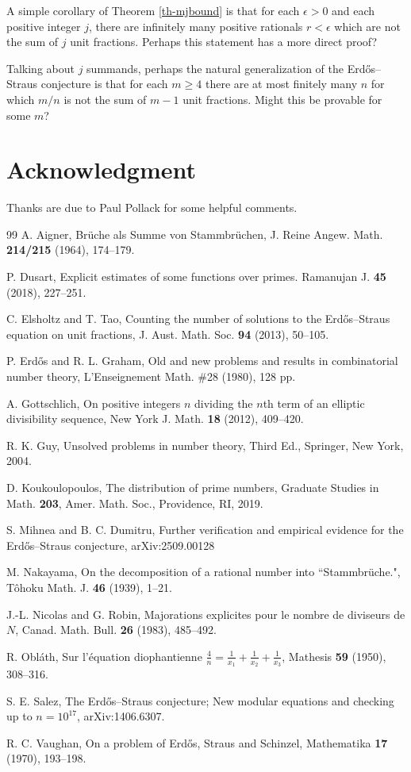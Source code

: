 \documentclass[12pt]{amsart}
\theoremstyle{definition}
\theoremstyle{remark}
\numberwithin{equation}{section}
\begin{document}
A simple corollary of Theorem \ref{th-mjbound} is that for each $\epsilon>0$ and each 
positive integer $j$, there are infinitely many positive rationals $r<\epsilon$ which are
not the sum of $j$ unit fractions.  Perhaps this statement has a more direct proof?

Talking about $j$ summands, perhaps the natural generalization of the Erd\H os--Straus
conjecture is that for each $m\ge4$ there are at most finitely many $n$ for which
$m/n$ is not the sum of $m-1$ unit fractions.   Might this be provable for some $m$?

\section*{Acknowledgment}
Thanks are due to Paul Pollack for some helpful comments.

\begin{thebibliography}{99}
 A. Aigner, Br\"uche als Summe von Stammbr\"uchen, J. Reine Angew. Math. 
 {\bf 214/215} (1964), 174--179.
 
 P. Dusart,
Explicit estimates of some functions over primes. Ramanujan J. {\bf45} (2018), 227--251. 

 C. Elsholtz and T. Tao,
Counting the number of solutions to the Erd\H{o}s--Straus equation on unit fractions,
J. Aust. Math. Soc. {\bf94 }(2013), 50--105.

 P. Erd\H os and R. L. Graham,
Old and new problems and results in combinatorial number theory,
L'Enseignement Math. \#28 (1980), 128 pp.

 A. Gottschlich,
On positive integers $n$ dividing the $n$th
term of an elliptic divisibility sequence,
New York J. Math. {\bf18} (2012), 409--420.

 R. K. Guy,
Unsolved problems in number theory,
Third Ed., Springer, New York, 2004.

 D. Koukoulopoulos,
The distribution of prime numbers, Graduate Studies in Math. {\bf203},
Amer. Math. Soc., Providence, RI, 2019.

 S. Mihnea and B. C. Dumitru,
Further verification and empirical evidence for the Erd\H os--Straus conjecture,
arXiv:2509.00128

M. Nakayama, On the decomposition of a rational number into ``Stammbr\"uche.", 
T\^{o}hoku Math. J. {\bf46} (1939), 1--21.

J.-L. Nicolas and G. Robin, Majorations explicites pour le nombre de diviseurs de $N$, Canad. Math.
Bull. {\bf26} (1983), 485--492.

 R. Obl\'ath,
Sur l'\'equation diophantienne $\frac4n=\frac1{x_1}+\frac1{x_2}+\frac1{x_3}$,
Mathesis {\bf59} (1950), 308--316.

 S. E. Salez,
The Erd\H os--Straus conjecture; New modular equations and checking up to
$n = 10^{17}$, arXiv:1406.6307.

 R. C. Vaughan,
On a problem of Erd\H os, Straus and Schinzel,
Mathematika {\bf17} (1970), 193--198.

\end{thebibliography}
\end{document}
